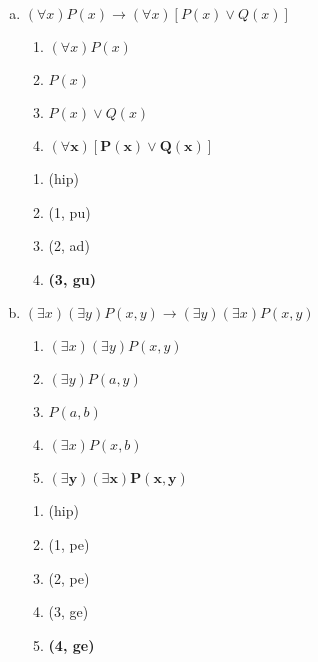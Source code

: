 \documentclass[a4paper, 12pt, addpoints]{exam}
\begin{document}
\begin{questions}
\begin{resp}
    \begin{enumerate}[a)]
      \item $(\forall x)P(x) \rightarrow (\forall x)[P(x) \lor Q(x)]$
            \begin{multicols}{2}

              \begin{enumerate}[1.]
                \item $(\forall x)P(x)$
                \item $P(x)$
                \item $P(x) \lor Q(x)$
                \item $\boldsymbol{(\forall x)[P(x) \lor Q(x)]}$
              \end{enumerate}

              \columnbreak

              \begin{enumerate}[\ding{32}]
                \item (hip)
                \item (1, pu)
                \item (2, ad)
                \item \textbf{(3, gu)}
              \end{enumerate}

            \end{multicols}

      \item $(\exists x)(\exists y)P(x, y) \rightarrow (\exists y)(\exists x)P(x, y)$
            \begin{multicols}{2}

              \begin{enumerate}[1.]
                \item $(\exists x)(\exists y)P(x, y)$
                \item $(\exists y)P(a,y)$
                \item $P(a,b)$
                \item $(\exists x)P(x,b)$
                \item $\boldsymbol{(\exists y)(\exists x)P(x, y)}$
              \end{enumerate}

              \columnbreak

              \begin{enumerate}[\ding{32}]
                \item (hip)
                \item (1, pe)
                \item (2, pe)
                \item (3, ge)
                \item \textbf{(4, ge)}
              \end{enumerate}


\end{multicols}
\end{enumerate}
\end{resp}
\end{questions}
\end{document}
